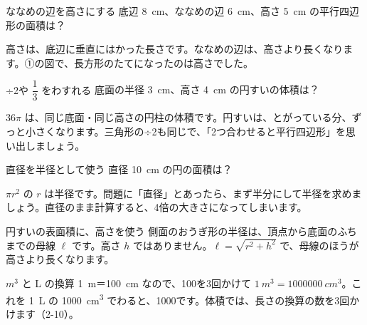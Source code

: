 
\begin{tsumazuki}{ななめの辺を高さにする}
底辺 \qty{8}{cm}、ななめの辺 \qty{6}{cm}、高さ \qty{5}{cm} の平行四辺形の面積は？\par
{}
高さは、底辺に垂直にはかった長さです。ななめの辺は、高さより長くなります。①の図で、長方形のたてになったのは高さでした。
\end{tsumazuki}

\begin{tsumazuki}{÷2や $\dfrac{1}{3}$ をわすれる}
底面の半径 \qty{3}{cm}、高さ \qty{4}{cm} の円すいの体積は？\par
{}
$36\pi$ は、同じ底面・同じ高さの円柱の体積です。円すいは、とがっている分、ずっと小さくなります。三角形の÷2も同じで、「2つ合わせると平行四辺形」を思い出しましょう。
\end{tsumazuki}

\begin{tsumazuki}{直径を半径として使う}
直径 \qty{10}{cm} の円の面積は？\par
{}
$\pi r^2$ の $r$ は半径です。問題に「直径」とあったら、まず半分にして半径を求めましょう。直径のまま計算すると、4倍の大きさになってしまいます。
\end{tsumazuki}

\begin{tsumazuki}{円すいの表面積に、高さを使う}
側面のおうぎ形の半径は、頂点から底面のふちまでの母線 $\ell$ です。高さ $h$ ではありません。$\ell=\sqrt{r^2+h^2}$ で、母線のほうが高さより長くなります。
\end{tsumazuki}

\begin{tsumazuki}{$\unit{m^3}$ と L の換算}
\qty{1}{m}＝\qty{100}{cm} なので、100を3回かけて \mbox{$\qty{1}{m^3}=\qty{1000000}{cm^3}$}。これを \qty{1}{L} の \qty{1000}{cm^3} でわると、1000です。体積では、長さの換算の数を3回かけます（2-10）。
\end{tsumazuki}


